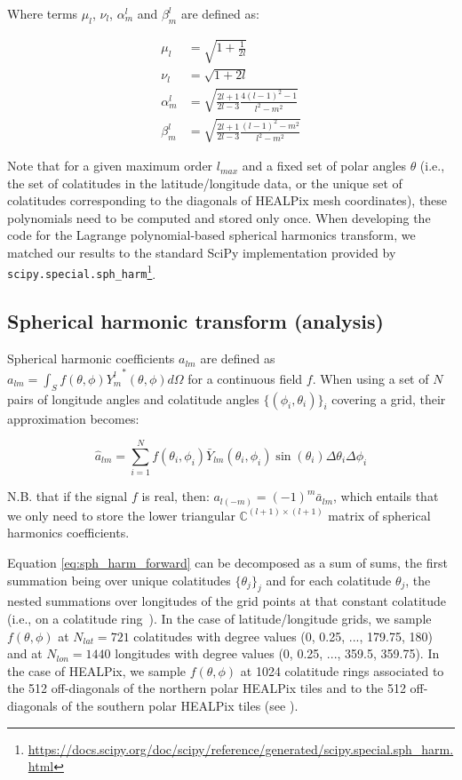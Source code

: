Where terms $\mu_l$, $\nu_l$, $\alpha_m^l$ and $\beta_m^l$ are defined as:

\begin{align}
\mu_l &= \sqrt{1 + \frac{1}{2l}} \\
\nu_l &= \sqrt{1+2l} \\
\alpha_m^l &= \sqrt{\frac{2l+1}{2l-3}\frac{4(l-1)^2-1}{l^2 - m^2}} \\
\beta_m^l &= \sqrt{\frac{2l+1}{2l-3}\frac{(l-1)^2-m^2}{l^2 - m^2}}
\end{align}

Note that for a given maximum order $l_{max}$ and a fixed set of polar angles $\theta$ (i.e., the set of colatitudes in the latitude/longitude data, or the unique set of colatitudes corresponding to the diagonals of HEALPix mesh coordinates), these polynomials need to be computed and stored only once. When developing the code for the Lagrange polynomial-based spherical harmonics transform, we matched our results to the standard SciPy implementation provided by {\tt scipy.special.sph\_harm}\footnote{\url{https://docs.scipy.org/doc/scipy/reference/generated/scipy.special.sph\_harm.html}}.

\subsection{Spherical harmonic transform (analysis)}

Spherical harmonic coefficients $a_{lm}$ are defined as
$a_{lm} = \int_{S} f(\theta, \phi) {Y_m^l}^*(\theta, \phi) d\Omega$ for a continuous field $f$. When using a set of $N$ pairs of longitude angles and colatitude angles $\{(\phi_i, \theta_i)\}_i$ covering a grid, their approximation becomes:

\begin{equation}
\hat{a}_{lm} = \sum_{i=1}^N f(\theta_i, \phi_i) \bar{Y}_{lm}(\theta_i, \phi_i) \sin(\theta_i)\Delta\theta_i\Delta\phi_i
\label{eq:sph_harm_forward}
\end{equation}

N.B. that if the signal $f$ is real, then: $a_{l(-m)} = (-1)^m \bar{a}_{lm}$, which entails that we only need to store the lower triangular $\mathbb{C} ^{(l+1) \times (l+1)}$ matrix of spherical harmonics coefficients.

Equation \ref{eq:sph_harm_forward} can be decomposed as a sum of sums, the first summation being over unique colatitudes $\{\theta_j\}_j$ and for each colatitude $\theta_j$, the nested summations over longitudes of the grid points at that constant colatitude (i.e., on a colatitude ring~\citep{willmert2022ring}). In the case of latitude/longitude grids, we sample $f(\theta, \phi)$ at $N_{lat}=721$ colatitudes with degree values (0, 0.25, ..., 179.75, 180) and at $N_{lon}=1440$ longitudes with degree values (0, 0.25, ..., 359.5, 359.75). In the case of HEALPix, we sample $f(\theta, \phi)$ at 1024 colatitude rings associated to the 512 off-diagonals of the northern polar HEALPix tiles and to the 512 off-diagonals of the southern polar HEALPix tiles (see \citet{willmert2022ring}).

